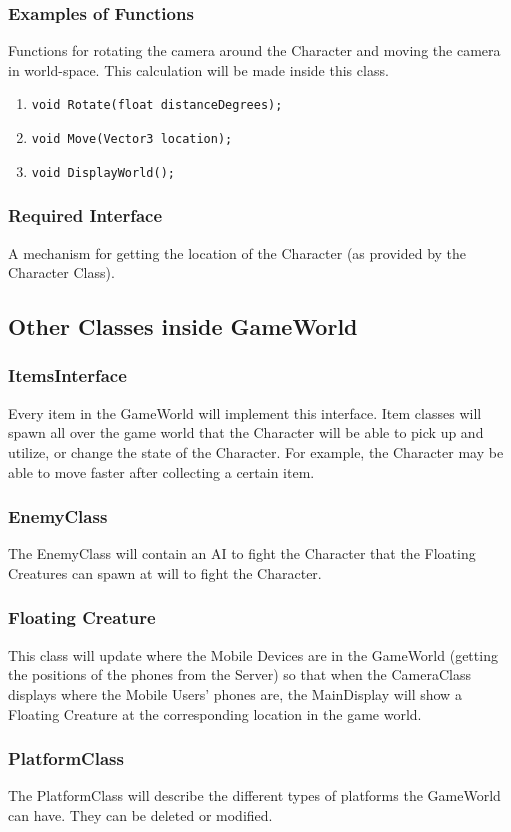 \documentclass[10pt,letterpaper,oneside,english]{article}
\newcommand{\code}[1]{\texttt{#1}}
\newcommand{\citem}[1]{\item \code{#1}}
\begin{document}
\subsubsection{Examples of Functions}
Functions for rotating the camera around the Character and moving the camera in world-space. This calculation will be made inside this class.
\begin{enumerate}
		\citem {void Rotate(float distanceDegrees);}
		\citem {void Move(Vector3 location);}
		\citem {void DisplayWorld();}
\end{enumerate}

\subsubsection{Required Interface}
	A mechanism for getting the location of the Character (as provided by the Character Class).

\subsection{Other Classes inside GameWorld}

\subsubsection{ItemsInterface}
Every item in the GameWorld will implement this interface. Item classes will spawn all over the game world that the Character will be able to pick up and utilize, or change the state of the Character. For example, the Character may be able to move faster after collecting a certain item.

\subsubsection{EnemyClass}
The EnemyClass will contain an AI to fight the Character that the Floating Creatures can spawn at will to fight the Character. 

\subsubsection{Floating Creature}
This class will update where the Mobile Devices are in the GameWorld (getting the positions of the phones from the Server) so that when the CameraClass displays where the Mobile Users’ phones are, the MainDisplay will show a Floating Creature at the corresponding location in the game world.

\subsubsection{PlatformClass}
The PlatformClass will describe the different types of platforms the GameWorld can have. They can be deleted or modified.
\end{document}
